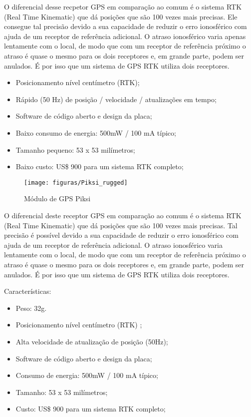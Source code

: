 O diferencial desse recpetor GPS em comparação ao comum é o sistema RTK (Real Time Kinematic) que dá posições que são 100 vezes mais precisas. Ele consegue tal precisão devido a sua capacidade de reduzir o erro ionosférico com ajuda de um receptor de referência adicional. O atraso ionosférico varia apenas lentamente com o local, de modo que com um receptor de referência próximo o atraso é quase o mesmo para os dois receptores e, em grande parte, podem ser anulados. É por isso que um sistema de GPS RTK utiliza dois receptores.\cite{alcoforado2000}

\begin{itemize}
	\item Posicionamento nível centímetro (RTK);
	\item Rápido (50 Hz) de posição / velocidade / atualizações em tempo;
	\item Software de código aberto e design da placa;
	\item Baixo consumo de energia: 500mW / 100 mA típico;
	\item Tamanho pequeno: 53 x 53 milímetros;
	\item Baixo custo: US\$ 900 para um sistema RTK completo;
\end{itemize}


\begin{figure}[H]
\centering\texttt{[image: figuras/Piksi\_rugged]}
\caption{Módulo de GPS Piksi}
\end{figure}

O diferencial deste receptor GPS em comparação ao comum é o sistema RTK (Real Time Kinematic) que dá posições que são 100 vezes mais precisas. Tal precisão é possível devido a sua capacidade de reduzir o erro ionosférico com ajuda de um receptor de referência adicional. O atraso ionosférico varia lentamente com o local, de modo que com um receptor de referência próximo o atraso é quase o mesmo para os dois receptores e, em grande parte, podem ser anulados. É por isso que um sistema de GPS RTK utiliza dois receptores. \cite{swift2013}

Características:
\begin{itemize}
	\item Peso: 32g.
	\item Posicionamento nível centímetro (RTK) ;
	\item Alta velocidade de atualização de posição (50Hz);
	\item Software de código aberto e design da placa;
	\item Consumo de energia: 500mW / 100 mA típico;
	\item Tamanho: 53 x 53 milímetros;
	\item Custo: US\$ 900 para um sistema RTK completo;
\end{itemize}

